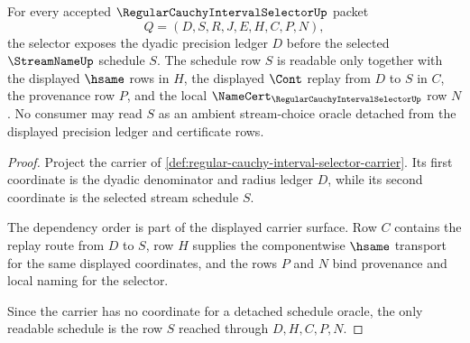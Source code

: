 \begin{theorem}
\label{thm:regular-cauchy-interval-selector-schedule-exposure}
For every accepted $\RegularCauchyIntervalSelectorUp$ packet
$$
Q=(D,S,R,J,E,H,C,P,N),
$$
the selector exposes the dyadic precision ledger $D$ before the selected $\StreamNameUp$ schedule $S$. The schedule row $S$ is readable only together with the displayed $\hsame$ rows in $H$, the displayed $\Cont$ replay from $D$ to $S$ in $C$, the provenance row $P$, and the local $\NameCert_{\RegularCauchyIntervalSelectorUp}$ row $N$. No consumer may read $S$ as an ambient stream-choice oracle detached from the displayed precision ledger and certificate rows.
\end{theorem}
\begin{proof}
Project the carrier of \autoref{def:regular-cauchy-interval-selector-carrier}. Its first coordinate is the dyadic denominator and radius ledger $D$, while its second coordinate is the selected stream schedule $S$.

The dependency order is part of the displayed carrier surface. Row $C$ contains the replay route from $D$ to $S$, row $H$ supplies the componentwise $\hsame$ transport for the same displayed coordinates, and the rows $P$ and $N$ bind provenance and local naming for the selector.

Since the carrier has no coordinate for a detached schedule oracle, the only readable schedule is the row $S$ reached through $D,H,C,P,N$.
\end{proof}

